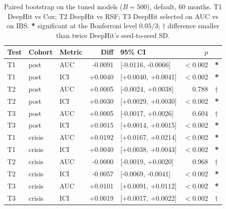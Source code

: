 \begin{table}[t]
\caption{Paired bootstrap on the tuned models ($B{=}500$), default, 60 months. T1 DeepHit vs Cox; T2 DeepHit vs RSF; T3 DeepHit selected on AUC vs on IBS. \textbf{*} significant at the Bonferroni level $0.05/3$; $\dagger$ difference smaller than twice DeepHit's seed-to-seed SD.}
\label{tab:sig}
\centering\footnotesize
\setlength{\tabcolsep}{4pt}
\begin{tabular}{@{}lllrlrl@{}}
\toprule
Test & Cohort & Metric & Diff & 95\% CI & $p$ & \\
\midrule
T1 & post & AUC & -0.0091 & [-0.0116, -0.0066] & $<$0.002 & \textbf{*} \\
T1 & post & ICI & +0.0040 & [+0.0040, +0.0041] & $<$0.002 & \textbf{*} \\
T2 & post & AUC & +0.0005 & [-0.0024, +0.0038] & 0.788 & $\dagger$ \\
T2 & post & ICI & +0.0030 & [+0.0029, +0.0030] & $<$0.002 & \textbf{*} \\
T3 & post & AUC & +0.0005 & [-0.0017, +0.0026] & 0.604 & $\dagger$ \\
T3 & post & ICI & +0.0015 & [+0.0014, +0.0015] & $<$0.002 & \textbf{*} \\
T1 & crisis & AUC & +0.0192 & [+0.0167, +0.0214] & $<$0.002 & \textbf{*} \\
T1 & crisis & ICI & +0.0040 & [+0.0038, +0.0043] & $<$0.002 & \textbf{*} \\
T2 & crisis & AUC & -0.0000 & [-0.0019, +0.0020] & 0.968 & $\dagger$ \\
T2 & crisis & ICI & -0.0057 & [-0.0069, -0.0041] & $<$0.002 & \textbf{*} \\
T3 & crisis & AUC & +0.0101 & [+0.0091, +0.0112] & $<$0.002 & \textbf{*} \\
T3 & crisis & ICI & +0.0019 & [+0.0017, +0.0022] & $<$0.002 & $\dagger$ \\
\bottomrule
\end{tabular}
\end{table}
